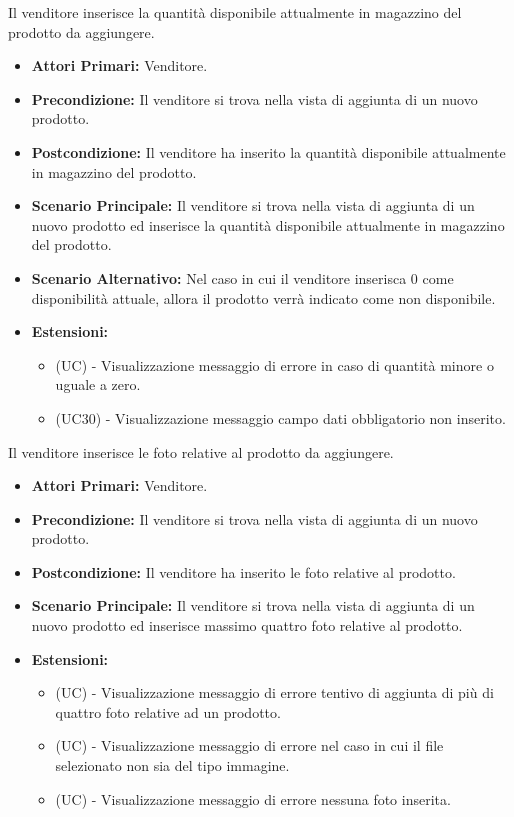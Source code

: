 Il venditore inserisce la quantità disponibile attualmente in magazzino del prodotto da aggiungere.
\begin{itemize}
    \item \textbf{Attori Primari:} Venditore.
    \item \textbf{Precondizione:} Il venditore si trova nella vista di aggiunta di un nuovo prodotto.
    \item \textbf{Postcondizione:} Il venditore ha inserito la quantità disponibile attualmente in magazzino del prodotto.
    \item \textbf{Scenario Principale:} Il venditore si trova nella vista di aggiunta di un nuovo prodotto ed inserisce la quantità disponibile attualmente in magazzino del prodotto.
    \item \textbf{Scenario Alternativo:} Nel caso in cui il venditore inserisca 0 come disponibilità attuale, allora il prodotto verrà indicato come non disponibile.
    \item \textbf{Estensioni:}
        \begin{itemize}
            \item (UC) - Visualizzazione messaggio di errore in caso di quantità minore o uguale a zero.
            \item (UC30) - Visualizzazione messaggio campo dati obbligatorio non inserito.
        \end{itemize}
\end{itemize}

Il venditore inserisce le foto relative al prodotto da aggiungere.
\begin{itemize}
    \item \textbf{Attori Primari:} Venditore.
    \item \textbf{Precondizione:} Il venditore si trova nella vista di aggiunta di un nuovo prodotto.
    \item \textbf{Postcondizione:} Il venditore ha inserito le foto relative al prodotto.
    \item \textbf{Scenario Principale:} Il venditore si trova nella vista di aggiunta di un nuovo prodotto ed inserisce massimo quattro foto relative al prodotto.
    \item \textbf{Estensioni:}
    \begin{itemize}
        \item (UC) - Visualizzazione messaggio di errore tentivo di aggiunta di più di quattro foto relative ad un prodotto.
        \item (UC) - Visualizzazione messaggio di errore nel caso in cui il file selezionato non sia del tipo immagine.
        \item (UC) - Visualizzazione messaggio di errore nessuna foto inserita.
    \end{itemize}
\end{itemize}

